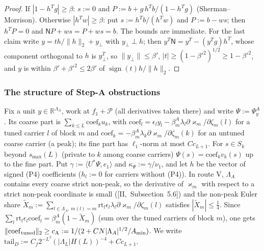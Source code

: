 \documentclass[10pt]{amsart}
\theoremstyle{definition}
\theoremstyle{remark}
\newcommand{\sgn}{\operatorname{sign}}
\newcommand{\R}{\mathbb R}
\newcommand{\ip}[2]{\langle #1,#2\rangle}
\begin{document}
\begin{proof}
If $|1-h^Tg|\ge\beta$: $s:=0$ and $P:=b+g\,h^Tb/(1-h^Tg)$ (Sherman--Morrison).
Otherwise $|h^Tw|\ge\beta$: put $s:=h^Tb/(h^Tw)$ and $P:=b-ws$; then $h^TP=0$ and
$\mathsf NP+ws=P+ws=b$.  The bounds are immediate.  For the last claim write
$y=th/\|h\|_2+y_\perp$ with $y_\perp\perp h$; then $y^T\mathsf N=y^T-(y^Tg)h^T$, whose
component orthogonal to $h$ is $y_\perp^T$, so $\|y_\perp\|\le\beta'$,
$|t|\ge(1-\beta'^2)^{1/2}\ge1-\beta'^2$, and $y$ is within $\beta'+\beta'^2\le
2\beta'$ of $\sgn(t)h/\|h\|_2$.
\end{proof}

\subsubsection*{The structure of Step-A obstructions}
Fix a unit $y\in\R^{\Lambda_A}$, work at $f_1+\mathcal P$ (all derivatives taken
there) and write $\Psi:=\Psi^A_y$.  Its coarse part is $\sum_{k\le L}
\mathrm{coef}_ku_k$, with $\mathrm{coef}_l=\epsilon_ly_l-\beta^A_{m}\lambda_l
\partial\varkappa_m/\partial\zeta_m(l)$ for a tuned carrier $l$ of block $m$ and
$\mathrm{coef}_k=-\beta^A_m\lambda_k\partial\varkappa_m/\partial\zeta_m(k)$ for an
untuned coarse carrier (a peak); its fine part has $\ell_1$-norm at most
$Cc_{L+1}$.  For $s\in S_k$ beyond $s_{\max}(L)$ (private to $k$ among coarse
carriers) $\Psi(s)=\mathrm{coef}_kv_k(s)$ up to the fine part.  Put
$\gamma:=\ip{U^*\Psi}{e_1}$ and $\kappa_\Psi:=\gamma/\nu_1$, and let $h$ be the
vector of signed (P4) coefficients ($h_l:=0$ for carriers without (P4)).  In
route V, $\Lambda_A$ contains every coarse strict non-peak, so the
derivative of $\varkappa_m$ with respect to a strict non-peak coordinate is
small ([II,~Subsection~5.6]) and the non-peak Euler share
$\tilde X_m:=\sum_{l\in\Lambda_A,\,m(l)=m}\mathrm{rt}_l\epsilon_l\lambda_l
\partial\varkappa_m/\partial\zeta_m(l)$ satisfies $|\tilde X_m|\le\frac14$.  Since
$\sum_{l}\mathrm{rt}_l\epsilon_l\mathrm{coef}_l=\beta^A_m(1-\tilde X_m)$ (sum over
the tuned carriers of block $m$), one gets $\|\mathrm{coef}_{\rm tuned}\|_2\ge
c_{\rm A}:=1/(2+CN|\Lambda_A|^{1/2}/A_{\min})$.  We write $\mathrm{tail}_D:=C_f2^{-L^2}
(|\Lambda_L|H(L))^{-4}+Cc_{L+1}$.
\end{document}
